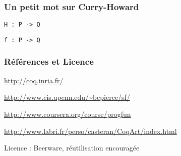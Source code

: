 \documentclass[9pt]{beamer}
\begin{document}
\begin{frame}
\frametitle{Un petit mot sur Curry-Howard}

\huge

\begin{center}
\texttt{H : P -> Q}

\pause
\texttt{f : P -> Q}
\end{center}

\end{frame}



\begin{frame}
\frametitle{Références et Licence}
\maketitle

\url{http://coq.inria.fr/}

\url{http://www.cis.upenn.edu/~bcpierce/sf/}

\url{http://www.coursera.org/course/progfun}

\url{http://www.labri.fr/perso/casteran/CoqArt/index.html}

\medskip
Licence : Beerware, réutilisation encouragée

\end{frame}
\end{document}
